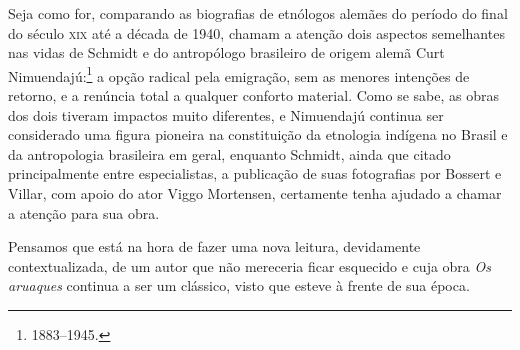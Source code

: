 Seja como for, comparando as biografias de etnólogos alemães do período
do final do século \textsc{xix} até a década de 1940, chamam a atenção dois
aspectos semelhantes nas vidas de Schmidt e do antropólogo brasileiro de
origem alemã Curt Nimuendajú:\footnote{1883--1945.} a opção radical pela
emigração, sem as menores intenções de retorno, e a renúncia total a
qualquer conforto material. Como se sabe, as obras dos dois tiveram
impactos muito diferentes, e Nimuendajú continua ser considerado uma
figura pioneira na constituição da etnologia indígena no Brasil e da
antropologia brasileira em geral, enquanto Schmidt, ainda que citado
principalmente entre especialistas, a publicação de suas
fotografias por Bossert e Villar, com apoio do ator Viggo
Mortensen, certamente tenha ajudado a chamar a atenção para sua obra.

Pensamos que está na hora de fazer uma nova leitura, devidamente
contextualizada, de um autor que não mereceria ficar esquecido e cuja
obra \textit{Os aruaques} continua a ser um clássico, visto que esteve à
frente de sua época.








